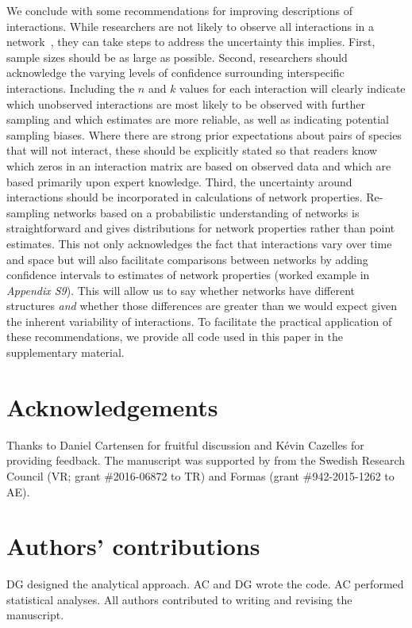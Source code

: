 \documentclass[12pt]{article}
\begin{document}
\begin{spacing}{1.5}
  We conclude with some recommendations for improving descriptions of interactions. While researchers are not likely to observe all interactions in a network~\citep{Jordano2016}, they can take steps to address the uncertainty this implies. First, sample sizes should be as large as possible. Second, researchers should acknowledge the varying levels of confidence surrounding interspecific interactions. Including the $n$ and $k$ values for each interaction will clearly indicate which unobserved interactions are most likely to be observed with further sampling and which estimates are more reliable, as well as indicating potential sampling biases. Where there are strong prior expectations about pairs of species that will not interact, these should be explicitly stated so that readers know which zeros in an interaction matrix are based on observed data and which are based primarily upon expert knowledge. Third, the uncertainty around interactions should be incorporated in calculations of network properties. Re-sampling networks based on a probabilistic understanding of networks is straightforward and gives distributions for network properties rather than point estimates. This not only acknowledges the fact that interactions vary over time and space but will also facilitate comparisons between networks by adding confidence intervals to estimates of network properties (worked example in \emph{Appendix S9}). This will allow us to say whether networks have different structures \emph{and} whether those differences are greater than we would expect given the inherent variability of interactions. To facilitate the practical application of these recommendations, we provide all code used in this paper in the supplementary material. 


\section*{Acknowledgements}

  Thanks to Daniel Cartensen for fruitful discussion and K\'{e}vin Cazelles for providing feedback. The manuscript was supported by from the Swedish Research Council (VR; grant \#2016-06872 to TR) and Formas (grant \#942-2015-1262 to AE).


\section*{Authors' contributions}

DG designed the analytical approach. AC and DG wrote the code. AC performed statistical analyses. All authors contributed to writing and revising the manuscript.



\end{spacing}
\end{document}
